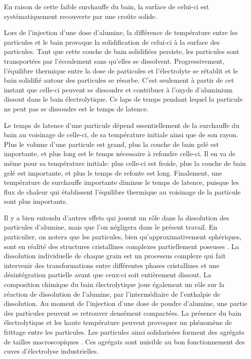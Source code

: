 En raison de cette faible surchauffe du bain, la surface de celui-ci
est systématiquement recouverte par une croûte solide.

Lors de l'injection d'une dose d'alumine, la différence de température
entre les particules et le bain provoque la solidification de celui-ci
à la surface des particules. Tant que cette couche de bain solidifiées
persiste, les particules sont transportées par l'écoulement sans
qu'elles se dissolvent. Progressivement, l'équilibre thermique
entre la dose de particules et l'électrolyte se rétablit et le bain
solidifié autour des particules se résorbe. C'est seulement à partir
de cet instant que celle-ci peuvent se dissoudre et contribuer à
l'oxyde d'aluminium dissout dans le bain électrolytique. Ce laps de
temps pendant lequel la particule ne peut pas se dissoudre est le
temps de latence.

Le temps de latence d'une particule dépend essentiellement de la
surchauffe du bain au voisinage de celle-ci, de sa température
initiale ainsi que de son rayon. Plus le volume d'une
particule est grand, plus la couche de bain gelé est importante, et
plus long est le temps nécessaire à refondre celle-ci. Il en va de
même pour sa température initiale: plus celle-ci est
froide, plus la couche de bain gelé est importante, et plus le temps
de refonte est long. Finalement, une température de surchauffe
importante diminue le temps de latence, puisque les flux de chaleur
qui établissent l'équilibre thermique au voisinage de la particule
sont plus importants.


Il y a bien entendu d'autres effets qui jouent un rôle dans la
dissolution des particules d'alumine, mais que l'on négligera dans
le présent travail. En particulier, on notera que les particules,
bien qu'approximativement sphériques, sont en réalité des
structures cristallines complexes partiellement poseuses
\cite{Ostbo2002}. La dissolution individuelle de chaque grain est un
processus complexe qui fait intervenir des transformations entre différentes phases
cristallines et une désintégration partielle avant que ceux-ci soit
entièrement dissout. La composition chimique du bain électrolytique
joue également un rôle sur la réaction de dissolution de l'alumine,
par l'intermédiaire de l'enthalpie de dissolution. Au moment de
l'injection d'une dose de poudre d'alumine, une partie des particules
peuvent se retrouver densément compactées. La présence du bain
électrolytique et les haute température peuvent provoquer un
phénomène de frittage entre les particules. Les particules ainsi
solidarisées forment des agrégats de tailles macroscopiques
\cite{Ostbo2002}.
Ces agrégats sont nuisible au bon fonctionnement des cuves
d'électrolyse industrielles.



